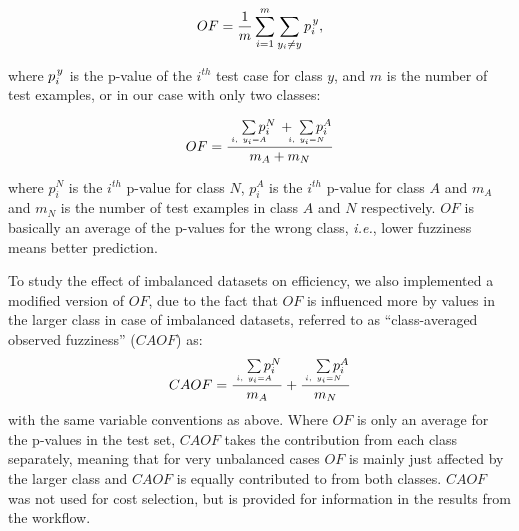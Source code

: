 \documentclass[utf8]{frontiersSCNS} %
\begin{document}
\begin{equation}
OF =\frac{ 1}{m} \sum\limits_{i=1}^{m} \sum\limits_{y_i \neq y }  p_i^{\kern1pt y},		
\end{equation}

where $p_i^{\kern1pt y}$ is the p-value of the $i^{th}$ test case for class $y$, and $m$ is the number of test examples, or in our case with only two classes:

\begin{equation}
OF =  \frac
        {\quad\sum\limits_{\mathclap{\substack{\scriptscriptstyle i,\ y_i=A}}}p_i^N \, + \;\sum\limits_{\mathclap{\substack{\scriptscriptstyle i,\ y_i=N}}}p_i^A}
        {m_A + m_N}
\end{equation}

where $p_i^N$ is the $i^{th}$ p-value for class $N$, $p_i^A$ is the $i^{th}$
p-value for class $A$ and $m_A$ and $m_N$ is the number of test examples in
class $A$ and $N$ respectively. $OF$ is basically an average of the p-values for
the wrong class, \textit{i.e.}, lower fuzziness means better prediction.

To study the effect of imbalanced datasets on efficiency, we also implemented a
modified version of $OF$, due to the fact that $OF$ is influenced more
by values in the larger class in case of imbalanced datasets, referred to as
``class-averaged
observed fuzziness'' ($CAOF$) as:
\begin{equation}
CAOF = \frac
        {\quad\sum\limits_{\mathclap{\substack{\scriptscriptstyle i,\ y_i=A}}}p_i^N}
        {m_A}
       + \frac
        {\quad\sum\limits_{\mathclap{\substack{\scriptscriptstyle i,\ y_i=N}}}p_i^A}
        {m_N}
\end{equation}
with the same variable conventions as above. Where $OF$ is only an average for
the p-values in the test set, $CAOF$ takes the contribution from each class
separately, meaning that for very unbalanced cases $OF$ is mainly just affected
by the larger class and $CAOF$ is equally contributed to from both classes.
%
%
%
$CAOF$ was not used for cost selection, but is provided for information in the
results from the workflow.
\end{document}
